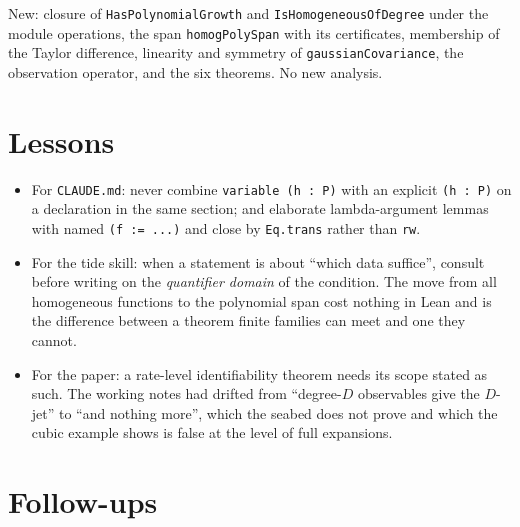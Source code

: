 \documentclass[11pt]{article}
\newcommand{\code}[1]{\texttt{#1}}
\begin{document}
New: closure of \code{HasPolynomialGrowth} and
\code{IsHomogeneousOfDegree} under the module operations, the span
\code{homogPolySpan} with its certificates, membership of the Taylor
difference, linearity and symmetry of \code{gaussianCovariance}, the
observation operator, and the six theorems. No new analysis.

\section{Lessons}

\begin{itemize}
\item For \code{CLAUDE.md}: never combine \code{variable (h : P)} with
an explicit \code{(h : P)} on a declaration in the same section; and
elaborate lambda-argument lemmas with named \code{(f := ...)} and close
by \code{Eq.trans} rather than \code{rw}.
\item For the tide skill: when a statement is about ``which data
suffice'', consult before writing on the \emph{quantifier domain} of the
condition. The move from all homogeneous functions to the polynomial
span cost nothing in Lean and is the difference between a theorem
finite families can meet and one they cannot.
\item For the paper: a rate-level identifiability theorem needs its
scope stated as such. The working notes had drifted from ``degree-$D$
observables give the $D$-jet'' to ``and nothing more'', which the
seabed does not prove and which the cubic example shows is false at the
level of full expansions.
\end{itemize}

\section{Follow-ups}
\end{document}
